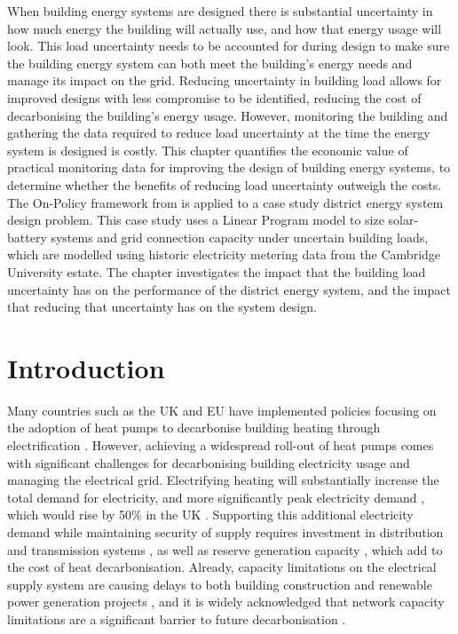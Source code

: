 \noindent
When building energy systems are designed there is substantial uncertainty in how much energy the building will actually use, and how that energy usage will look. This load uncertainty needs to be accounted for during design to make sure the building energy system can both meet the building's energy needs and manage its impact on the grid.
Reducing uncertainty in building load allows for improved designs with less compromise to be identified, reducing the cost of decarbonising the building's energy usage. However, monitoring the building and gathering the data required to reduce load uncertainty at the time the energy system is designed is costly.
This chapter quantifies the economic value of practical monitoring data for improving the design of building energy systems, to determine whether the benefits of reducing load uncertainty outweigh the costs.
The On-Policy  framework from  is applied to a case study district energy system design problem. This case study uses a Linear Program model to size solar-battery systems and grid connection capacity under uncertain building loads, which are modelled using historic electricity metering data from the Cambridge University estate.
The chapter investigates the impact that the building load uncertainty has on the performance of the district energy system, and the impact that reducing that uncertainty has on the system design.

\newpage
\section{Introduction}

Many countries such as the UK and EU have implemented policies focusing on the adoption of heat pumps to decarbonise building heating through electrification \citep{houseofcommons2022DecarbonisingHeatHomes,iea2021NetZero2050}. However, achieving a widespread roll-out of heat pumps comes with significant challenges for decarbonising building electricity usage and managing the electrical grid.
Electrifying heating will substantially increase the total demand for electricity, and more significantly peak electricity demand \citep{heinen2018HeatElectrificationLatest}, which would rise by 50\% in the UK \citep{zhang2022AssessmentImpactsHeat,charitopoulos2023Impact100Electrification}. Supporting this additional electricity demand while maintaining security of supply requires investment in distribution and transmission systems \citep{blonsky2019PotentialImpactsTransportation}, as well as reserve generation capacity \citep{charitopoulos2023Impact100Electrification}, which add to the cost of heat decarbonisation.
Already, capacity limitations on the electrical supply system are causing delays to both building construction and renewable power generation projects \citep{beis2023PoweringBritain,departmentforbusinessandtrade2023UKBatteryStrategy}, and it is widely acknowledged that network capacity limitations are a significant barrier to future decarbonisation \citep{haben2023ADViCEAIDecarbonisation}.


